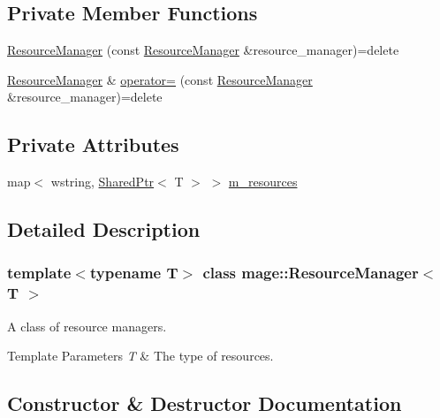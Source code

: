 \subsection*{Private Member Functions}
\begin{DoxyCompactItemize}
\item 
\hyperlink{classmage_1_1_resource_manager_a3b424e1ef7f543a2705d1124018d9921}{Resource\+Manager} (const \hyperlink{classmage_1_1_resource_manager}{Resource\+Manager} \&resource\+\_\+manager)=delete
\item 
\hyperlink{classmage_1_1_resource_manager}{Resource\+Manager} \& \hyperlink{classmage_1_1_resource_manager_a5cc1867dbb196671fb53763c98aee1dd}{operator=} (const \hyperlink{classmage_1_1_resource_manager}{Resource\+Manager} \&resource\+\_\+manager)=delete
\end{DoxyCompactItemize}
\subsection*{Private Attributes}
\begin{DoxyCompactItemize}
\item 
map$<$ wstring, \hyperlink{namespacemage_a1e01ae66713838a7a67d30e44c67703e}{Shared\+Ptr}$<$ T $>$ $>$ \hyperlink{classmage_1_1_resource_manager_a7d5f31a34e76f343988b7d6e9a62a617}{m\+\_\+resources}
\end{DoxyCompactItemize}


\subsection{Detailed Description}
\subsubsection*{template$<$typename T$>$\newline
class mage\+::\+Resource\+Manager$<$ T $>$}

A class of resource managers.


\begin{DoxyTemplParams}{Template Parameters}
{\em T} & The type of resources. \\
\hline
\end{DoxyTemplParams}


\subsection{Constructor \& Destructor Documentation}
\hypertarget{classmage_1_1_resource_manager_aeb324963a4bb56a359535b49930cbe9d}{}\label{classmage_1_1_resource_manager_aeb324963a4bb56a359535b49930cbe9d} 
